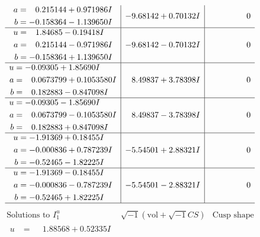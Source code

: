 \documentclass[1p]{elsarticle_modified}
\theoremstyle{definition}
\newcommand{\I}{\sqrt{-1}}
\begin{document}
$$\begin{array}{c|c|c}
\begin{aligned}
a &= \phantom{-}0.215144 + 0.971986 I \\
b &= -0.158364 - 1.139650 I\end{aligned}
 & -9.68142 + 0.70132 I & \phantom{-0.000000 } 0 \\ \hline\begin{aligned}
u &= \phantom{-}1.84685 - 0.19418 I \\
a &= \phantom{-}0.215144 - 0.971986 I \\
b &= -0.158364 + 1.139650 I\end{aligned}
 & -9.68142 - 0.70132 I & \phantom{-0.000000 } 0 \\ \hline\begin{aligned}
u &= -0.09305 + 1.85690 I \\
a &= \phantom{-}0.0673799 + 0.1053580 I \\
b &= \phantom{-}0.182883 - 0.847098 I\end{aligned}
 & \phantom{-}8.49837 + 3.78398 I & \phantom{-0.000000 } 0 \\ \hline\begin{aligned}
u &= -0.09305 - 1.85690 I \\
a &= \phantom{-}0.0673799 - 0.1053580 I \\
b &= \phantom{-}0.182883 + 0.847098 I\end{aligned}
 & \phantom{-}8.49837 - 3.78398 I & \phantom{-0.000000 } 0 \\ \hline\begin{aligned}
u &= -1.91369 + 0.18455 I \\
a &= -0.000836 + 0.787239 I \\
b &= -0.52465 - 1.82225 I\end{aligned}
 & -5.54501 + 2.88321 I & \phantom{-0.000000 } 0 \\ \hline\begin{aligned}
u &= -1.91369 - 0.18455 I \\
a &= -0.000836 - 0.787239 I \\
b &= -0.52465 + 1.82225 I\end{aligned}
 & -5.54501 - 2.88321 I & \phantom{-0.000000 } 0\\
 \hline 
 \end{array}$$\newpage$$\begin{array}{c|c|c}  
\text{Solutions to }I^u_{1}& \I (\text{vol} + \sqrt{-1}CS) & \text{Cusp shape}\\
 \hline 
\begin{aligned}
u &= \phantom{-}1.88568 + 0.52335 I \\

\end{aligned}
\end{array}$$
\end{document}

